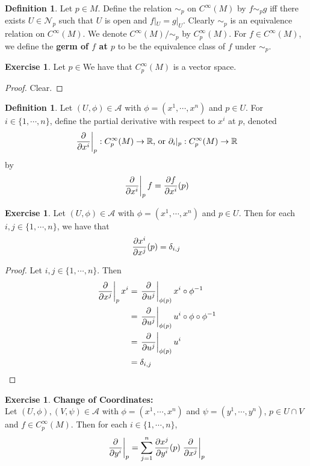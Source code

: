 \documentclass[12pt]{amsart}
\theoremstyle{definition}
\newtheorem{defn}[definition]{Definition}
\newtheorem{ex}[definition]{Exercise}
\newcommand{\del}{\delta}
\newcommand{\R}{\mathbb{R}}
\newcommand{\MA}{\mathcal{A}}
\newcommand{\MN}{\mathcal{N}}
\newcommand{\p}{\partial}
\begin{document}
	\begin{defn}
		Let $p \in M$. Define the relation $\sim_p$ on $C^{\infty}(M)$ by $f \sim_p g$ iff there exists $U \in \MN_p$ such that $U$ is open and $f|_U = g|_U$. Clearly $\sim_p$ is an equivalence relation on $C^{\infty}(M)$. We denote $C^{\infty}(M) / \sim_p$ by $C^{\infty}_p(M)$. For $f \in C^{\infty}(M)$, we define the \textbf{germ of $f$ at $p$} to be the equivalence class of $f$ under $\sim_p$. 
	\end{defn}
	
	\begin{ex}
		Let $p \in $We have that $C_p^{\infty}(M)$ is a vector space.
	\end{ex}
	
	\begin{proof}
		Clear.
	\end{proof}

	\begin{defn}
		Let $(U, \phi) \in \MA$ with $\phi = (x^1, \cdots, x^n)$ and $p \in U$. For $i \in \{1, \cdots, n\}$, define the partial derivative with respect to $x^i$ at $p$, denoted $$\eval{\pdv{x^i}}_{p}: C_p^{\infty}(M) \rightarrow \R  \text{, or } \p_i|_p: C_p^{\infty}(M) \rightarrow \R $$ by $$ \eval{\pdv{x^i}}_{p} f =  {\pdv{f}{x^i}}(p) $$
	\end{defn}

	\begin{ex}
		Let $(U, \phi) \in \MA$ with $\phi = (x^1, \cdots, x^n)$ and $p \in U$. Then for each $i,j \in \{1, \cdots, n\}$, we have that $${\pdv{x^i}{x^j}}(p) = \del_{i,j}$$
	\end{ex}

	\begin{proof}
		Let $i,j \in \{1, \cdots, n\}$. Then 
		\begin{align*}
			\eval{\pdv{x^j}}_{p} x^i 
			&=  \eval{\pdv{u^j}}_{\phi(p)} x^i \circ \phi^{-1} \\
			&= \eval{\pdv{u^j}}_{\phi(p)} u^i \circ \phi \circ \phi^{-1} \\
			&= \eval{\pdv{u^j}}_{\phi(p)} u^i  \\
			&= \del_{i,j}
		\end{align*}
	\end{proof}

	\begin{ex} \textbf{Change of Coordinates:}\\
		Let $(U, \phi), (V, \psi) \in \MA$ with $\phi = (x^1, \cdots, x^n)$ and $\psi = (y^1, \cdots, y^n)$, $p \in U \cap V$ and $f \in C_p^{\infty}(M)$. Then for each $i \in \{1, \cdots, n\}$, 
		 $$\eval{\pdv{y^i}}_{p} = \sum_{j =1}^n {\pdv{x^j}{y^i}}(p) \eval{\pdv{x^j}}_{p}    $$
	\end{ex}
\end{document}
